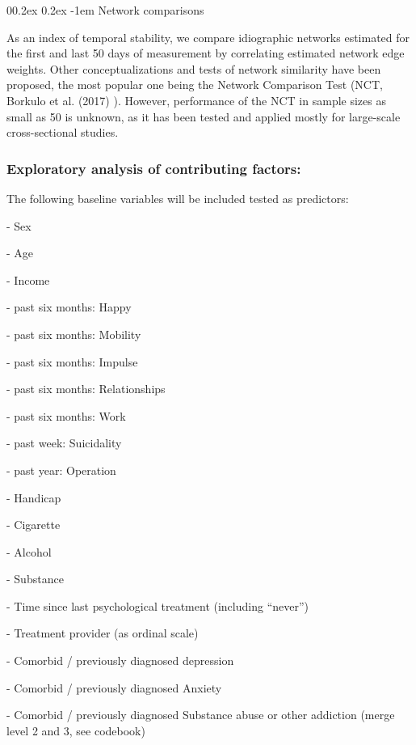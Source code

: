 \documentclass[
  english,
  man]{apa6}
\makeatletter
\let\oldparagraph\paragraph
\renewcommand{\paragraph}[1]{\oldparagraph{#1}\mbox{}}
\renewcommand{\paragraph}{\@startsection{paragraph}{4}{\parindent}%
  {0\baselineskip \@plus 0.2ex \@minus 0.2ex}%
  {-1em}%
  {\normalfont\normalsize\bfseries\itshape\typesectitle}}
\makeatother
\begin{document}
\hypertarget{network-comparisons}{%
\paragraph{Network comparisons}\label{network-comparisons}}

As an index of temporal stability, we compare idiographic networks estimated for the first and last 50 days of measurement by correlating estimated network edge weights. Other conceptualizations and tests of network similarity have been proposed, the most popular one being the Network Comparison Test (NCT, Borkulo et al. (2017) ). However, performance of the NCT in sample sizes as small as 50 is unknown, as it has been tested and applied mostly for large-scale cross-sectional studies.

\hypertarget{exploratory-analysis-of-contributing-factors}{%
\subsubsection{Exploratory analysis of contributing factors:}\label{exploratory-analysis-of-contributing-factors}}

The following baseline variables will be included tested as predictors:

- Sex

- Age

- Income

- past six months: Happy

- past six months: Mobility

- past six months: Impulse

- past six months: Relationships

- past six months: Work

- past week: Suicidality

- past year: Operation

- Handicap

- Cigarette

- Alcohol

- Substance

- Time since last psychological treatment (including ``never'')

- Treatment provider (as ordinal scale)

- Comorbid / previously diagnosed depression

- Comorbid / previously diagnosed Anxiety

- Comorbid / previously diagnosed Substance abuse or other addiction (merge level 2 and 3, see codebook)
\end{document}
